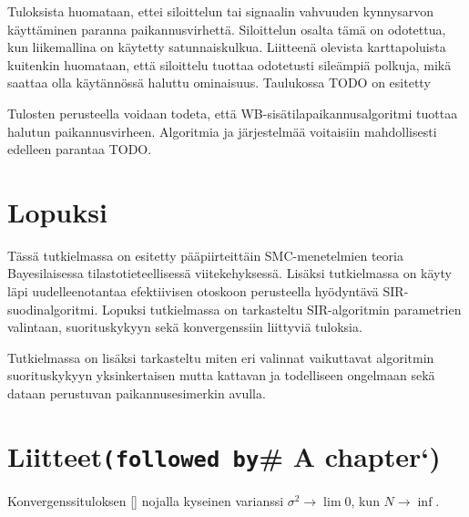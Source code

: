 \documentclass[
  12pt,
  a4paper, twoside]{book}
\begin{document}
Tuloksista huomataan, ettei siloittelun tai signaalin vahvuuden kynnysarvon käyttäminen paranna paikannusvirhettä. Siloittelun osalta tämä on odotettua, kun liikemallina on käytetty satunnaiskulkua. Liitteenä olevista karttapoluista kuitenkin huomataan, että siloittelu tuottaa odotetusti sileämpiä polkuja, mikä saattaa olla käytännössä haluttu ominaisuus. Taulukossa TODO on esitetty

Tulosten perusteella voidaan todeta, että WB-sisätilapaikannusalgoritmi tuottaa halutun paikannusvirheen. Algoritmia ja järjestelmää voitaisiin mahdollisesti edelleen parantaa TODO.

\hypertarget{lopuksi}{%
\chapter{Lopuksi}\label{lopuksi}}

Tässä tutkielmassa on esitetty pääpiirteittäin SMC-menetelmien teoria Bayesilaisessa tilastotieteellisessä viitekehyksessä. Lisäksi tutkielmassa on käyty läpi uudelleenotantaa efektiivisen otoskoon perusteella hyödyntävä SIR-suodinalgoritmi. Lopuksi tutkielmassa on tarkasteltu SIR-algoritmin parametrien valintaan, suorituskykyyn sekä konvergenssiin liittyviä tuloksia.

Tutkielmassa on lisäksi tarkasteltu miten eri valinnat vaikuttavat algoritmin suorituskykyyn yksinkertaisen mutta kattavan ja todelliseen ongelmaan sekä dataan perustuvan paikannusesimerkin avulla.

\hypertarget{liitteetfollowed-by-a-chapter}{%
\chapter{\texorpdfstring{Liitteet\texttt{(followed\ by}\# A chapter`)}{Liitteet(followed by\# A chapter`)}}\label{liitteetfollowed-by-a-chapter}}

Konvergenssituloksen \ref{} nojalla kyseinen varianssi \(\sigma^2 \rightarrow \lim 0\), kun \(N \rightarrow \inf\).

  
\end{document}
